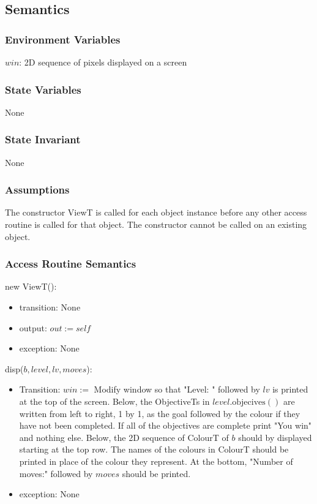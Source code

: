 \documentclass[12pt]{article}
\begin{document}
\subsection* {Semantics}

\subsubsection* {Environment Variables}

$win$: 2D sequence of pixels displayed on a screen

\subsubsection* {State Variables}

None

\subsubsection* {State Invariant}

None

\subsubsection* {Assumptions}

The constructor ViewT is called for each object instance before any other
access routine is called for that object.  The constructor cannot be called on
an existing object.

\subsubsection* {Access Routine Semantics}

new ViewT():
\begin{itemize}
	\item transition: None
	\item output: $out := \mathit{self}$
	\item exception: None
\end{itemize}

\noindent disp($b, level, lv, moves$):
\begin{itemize}
	\item Transition: $win := $ Modify window so that "Level: " followed by $lv$ is printed at the top of the screen. Below, the ObjectiveTs in $level.\mbox{objecives}()$ are written from left to right, 1 by 1, as the goal followed by the colour if they have not been completed. If all of the objectives are complete print "You win" and nothing else. Below, the 2D sequence of ColourT of $b$ should by displayed starting at the top row. The names of the colours in ColourT should be printed in place of the colour they represent. At the bottom, "Number of moves:" followed by $moves$ should be printed.
	\item exception: None
\end{itemize}
\end{document}
